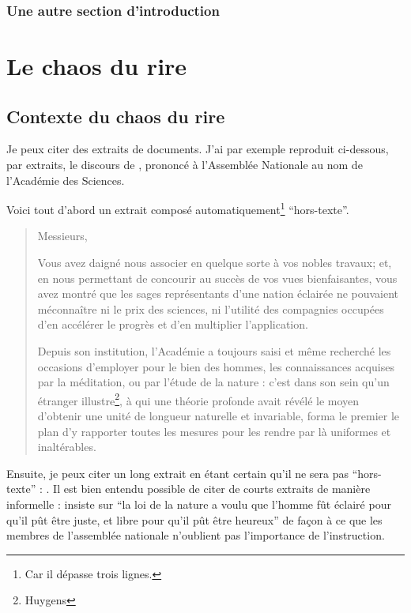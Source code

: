\documentclass[12pt,version=final,space=onehalf,localtocs,localbibs]{yathesis}
\begin{document}
\section{Une autre section d'introduction}
\lipsum[37]
%
%
\part{Le chaos du rire}
%
\chapter{Contexte du chaos du rire}

Je peux citer des extraits de
documents. J'ai par exemple reproduit ci-dessous, par extraits, le discours de
\citeauthor{cond}, prononcé à l'Assemblée Nationale au nom de l'Académie des
Sciences.

Voici tout d'abord un extrait composé automatiquement\footnote{Car il dépasse
  trois lignes.} \enquote{hors-texte}.
%
\blockcquote[508-509]{cond}{%
  Messieurs,

  Vous avez daigné nous associer en quelque sorte à vos nobles
  travaux; et, en nous permettant de concourir au succès de vos vues
  bienfaisantes, vous avez montré que les sages représentants d'une
  nation éclairée ne pouvaient méconnaître ni le prix des sciences, ni
  l'utilité des compagnies occupées d'en accélérer le progrès et d'en
  multiplier l'application.

  Depuis son institution, l'Académie a toujours saisi et même
  recherché les occasions d'employer pour le bien des hommes, les
  connaissances acquises par la méditation, ou par l'étude de la
  nature : c'est dans son sein qu'un étranger
  illustre\footnote{Huygens}, à qui une théorie profonde avait révélé
  le moyen d'obtenir une unité de longueur naturelle et invariable,
  forma le premier le plan d'y rapporter toutes les mesures pour les
  rendre par là uniformes et inaltérables.
}

Ensuite, je peux citer un long extrait en étant certain qu'il ne
sera pas \enquote{hors-texte} :
. Il est bien entendu possible de citer de courts extraits
de manière informelle : \citeauthor{cond}
insiste sur \enquote{la loi de la nature a voulu que
  l'homme fût éclairé pour qu'il pût être juste, et libre pour qu'il
  pût être heureux} de façon à ce que les membres de l'assemblée
nationale n'oublient pas l'importance de l'instruction.
\end{document}
